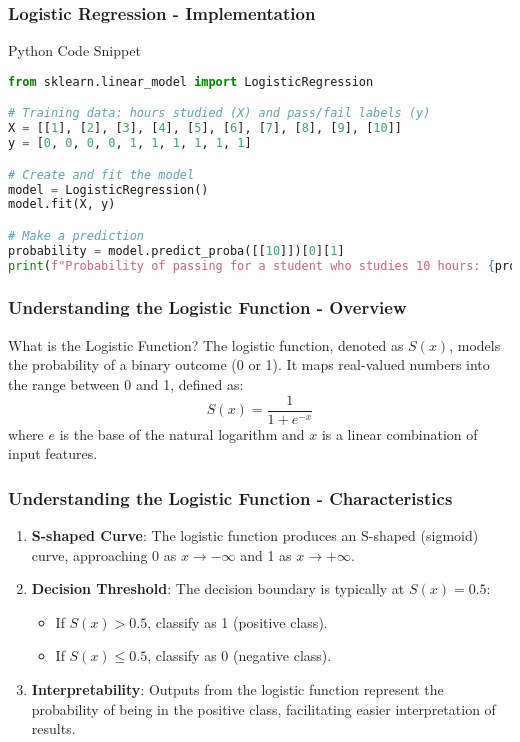 \documentclass[aspectratio=169]{beamer}
\begin{document}
\begin{frame}[fragile]
    \frametitle{Logistic Regression - Implementation}
    \begin{block}{Python Code Snippet}
    \begin{lstlisting}[language=Python]
from sklearn.linear_model import LogisticRegression

# Training data: hours studied (X) and pass/fail labels (y)
X = [[1], [2], [3], [4], [5], [6], [7], [8], [9], [10]]
y = [0, 0, 0, 0, 1, 1, 1, 1, 1, 1]

# Create and fit the model
model = LogisticRegression()
model.fit(X, y)

# Make a prediction
probability = model.predict_proba([[10]])[0][1]
print(f"Probability of passing for a student who studies 10 hours: {probability:.2f}")
    \end{lstlisting}
    \end{block}
\end{frame}

\begin{frame}[fragile]
    \frametitle{Understanding the Logistic Function - Overview}
    
    \begin{block}{What is the Logistic Function?}
        The logistic function, denoted as \( S(x) \), models the probability of a binary outcome (0 or 1). It maps real-valued numbers into the range between 0 and 1, defined as:
        \[
        S(x) = \frac{1}{1 + e^{-x}}
        \]
        where \( e \) is the base of the natural logarithm and \( x \) is a linear combination of input features.
    \end{block}
\end{frame}

\begin{frame}[fragile]
    \frametitle{Understanding the Logistic Function - Characteristics}

    \begin{enumerate}
        \item \textbf{S-shaped Curve}: The logistic function produces an S-shaped (sigmoid) curve, approaching 0 as \( x \to -\infty \) and 1 as \( x \to +\infty \).
        
        \item \textbf{Decision Threshold}: The decision boundary is typically at \( S(x) = 0.5 \):
        \begin{itemize}
            \item If \( S(x) > 0.5 \), classify as 1 (positive class).
            \item If \( S(x) \leq 0.5 \), classify as 0 (negative class).
        \end{itemize}
        
        \item \textbf{Interpretability}: Outputs from the logistic function represent the probability of being in the positive class, facilitating easier interpretation of results.
    \end{enumerate}
\end{frame}
\end{document}
